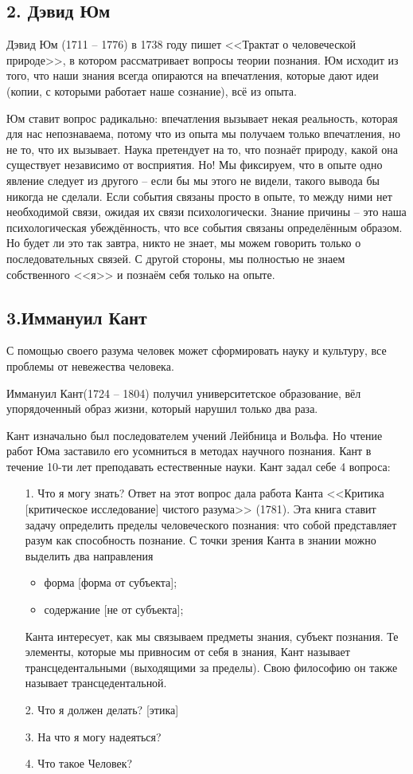 \documentclass[a4paper, 12pt]{book} %
\begin{document}
\subsection*{2. Дэвид Юм}
Дэвид Юм (1711 -- 1776) в 1738 году пишет <<Трактат о человеческой природе>>, в котором рассматривает вопросы теории познания. Юм исходит из того, что наши знания всегда опираются на впечатления, которые дают идеи (копии, с которыми работает наше сознание), всё из опыта.

Юм ставит вопрос радикально: впечатления вызывает некая реальность, которая для нас непознаваема, потому что из опыта мы получаем только впечатления, но не то, что их вызывает. Наука претендует на то, что познаёт природу, какой она существует независимо от восприятия.
Но! Мы фиксируем, что в опыте одно явление следует из другого -- если бы мы этого не видели, такого вывода бы никогда не сделали. Если события связаны просто в опыте, то между ними нет необходимой связи, ожидая их связи психологически. Знание причины -- это наша психологическая убеждённость, что все события связаны определённым образом. Но будет ли это так завтра, никто не знает, мы можем говорить только о последовательных связей. С другой стороны, мы полностью не знаем собственного <<я>> и познаём себя только на опыте.

\subsection*{3.Иммануил Кант}

С помощью своего разума человек может сформировать науку и 
культуру, все проблемы от невежества человека.

Иммануил Кант(1724 -- 1804) получил университетское образование, вёл упорядоченный образ жизни, который нарушил только два раза.

Кант изначально был последователем учений Лейбница и Вольфа. Но чтение работ Юма заставило его усомниться в методах научного познания. Кант в течение 10-ти лет преподавать естественные науки. Кант задал себе 4 вопроса:
\begin{itemize}
\item[1.] Что я могу знать?
Ответ на этот вопрос дала работа Канта <<Критика [критическое исследование] чистого разума>> (1781). Эта книга ставит задачу определить пределы человеческого познания: что собой представляет разум как способность познание. С точки зрения Канта в знании можно выделить два направления
\begin{itemize}
\item форма [форма от субъекта];
\item содержание [не от субъекта];
\end{itemize}
Канта интересует, как мы связываем предметы знания, субъект познания. Те элементы, которые мы привносим от себя в знания, Кант называет трансцедентальными (выходящими за пределы). Свою философию он также называет трансцедентальной.
\item[2.] Что я должен делать? [этика]
\item[3.] На что я могу надеяться?
\item[4.] Что такое Человек?
\end{itemize}
\end{document}

